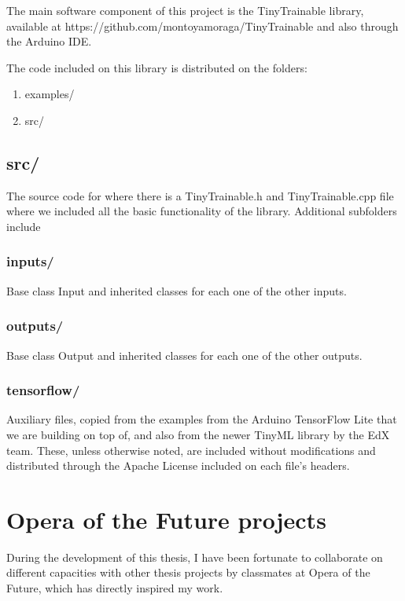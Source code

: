 The main software component of this project is the TinyTrainable library, available at https://github.com/montoyamoraga/TinyTrainable and also through the Arduino IDE.

The code included on this library is distributed on the folders:

\begin{enumerate}
  \item examples/
  \item src/
\end{enumerate}

\subsection{src/}

The source code for where there is a TinyTrainable.h and TinyTrainable.cpp file where we included all the basic functionality of the library. Additional subfolders include

\subsubsection{inputs/}

Base class Input and inherited classes for each one of the other inputs.

\subsubsection{outputs/}

Base class Output and inherited classes for each one of the other outputs.

\subsubsection{tensorflow/}

Auxiliary files, copied from the examples from the Arduino TensorFlow Lite that we are building on top of, and also from the newer TinyML library by the EdX team. These, unless otherwise noted, are included without modifications and distributed through the Apache License included on each file's headers.

\section{Opera of the Future projects}

During the development of this thesis, I have been fortunate to collaborate on different capacities with other thesis projects by classmates at Opera of the Future, which has directly inspired my work.

